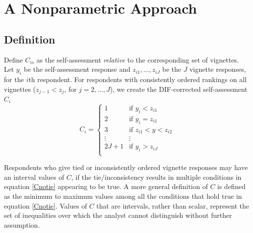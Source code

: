 \documentclass{amsart}
\begin{document}
\section{A Nonparametric Approach} \label{s:nonp}
\subsection{Definition}
Define $C_{is}$ as the self-assessment \emph{relative} to the
corresponding set of vignettes.   Let $y_i$ be the self-assessment response and
$z_{i1},\dots,z_{iJ}$ be the $J$ vignette responses, for the $i$th
respondent.  For respondents with consistently ordered rankings on all
vignettes ($z_{j-1} < z_j$, for $j=2,\dots,J$), we create the
DIF-corrected self-assessment $C_i$
\begin{equation}\label{Cnotie}
  C_i = 
  \begin{cases}
    1 & \mbox{if $y_i     < z_{i1}$}\\
    2 & \mbox{if $y_i     = z_{i1}$}\\
    3 & \mbox{if $z_{i1} < y < z_{i2}$}\\
    \vdots & \vdots \\
    2J+1 & \mbox{if $y_i > z_{iJ}$}\\
  \end{cases}
\end{equation}

Respondents who give tied or inconsistently ordered vignette responses
may have an interval values of $C$, if the tie/inconsistency results
in multiple conditions in equation \ref{Cnotie} appearing to be true.
A more general definition of $C$ is defined as the minimum to maximum
values among all the conditions that hold true in equation
\ref{Cnotie}. Values of $C$ that are intervals, rather than scalar,
represent the set of inequalities over which the analyst cannot
distinguish without further assumption.
\end{document}
